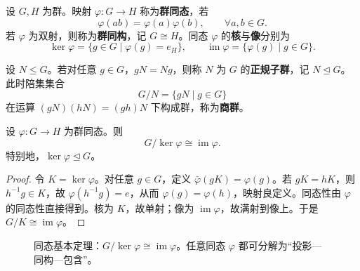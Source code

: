 \begin{definition}[群同态与同构]\label{def:homomorphism}
设 $G,H$ 为群。映射 $\varphi:G\to H$ 称为\textbf{群同态}，若
\[
\varphi(ab)=\varphi(a)\varphi(b),\qquad \forall a,b\in G.
\]
若 $\varphi$ 为双射，则称为\textbf{群同构}，记 $G\cong H$。同态 $\varphi$ 的\textbf{核}与\textbf{像}分别为
\[
\ker\varphi=\{g\in G\mid \varphi(g)=e_H\},\qquad
\operatorname{im}\varphi=\{\varphi(g)\mid g\in G\}.
\]
\end{definition}

\begin{definition}[正规子群与商群]\label{def:normal_subgroup}
设 $N\le G$。若对任意 $g\in G$，$gN=Ng$，则称 $N$ 为 $G$ 的\textbf{正规子群}，记 $N\trianglelefteq G$。此时陪集集合
\[
G/N=\{gN\mid g\in G\}
\]
在运算 $(gN)(hN)=(gh)N$ 下构成群，称为\textbf{商群}。
\end{definition}

\begin{theorem}[同态基本定理]\label{thm:first_isomorphism}
设 $\varphi:G\to H$ 为群同态。则
\[
G/\ker\varphi\cong \operatorname{im}\varphi.
\]
特别地，$\ker\varphi\trianglelefteq G$。
\end{theorem}

\begin{proof}
令 $K=\ker\varphi$。对任意 $g\in G$，定义 $\bar\varphi(gK)=\varphi(g)$。若 $gK=hK$，则 $h^{-1}g\in K$，故 $\varphi(h^{-1}g)=e$，从而 $\varphi(g)=\varphi(h)$，映射良定义。同态性由 $\varphi$ 的同态性直接得到。核为 $K$，故单射；像为 $\operatorname{im}\varphi$，故满射到像上。于是 $G/K\cong \operatorname{im}\varphi$。
\end{proof}

\begin{figure}[htbp]
\centering
{}
\caption{同态基本定理：$G/\ker\varphi\cong\operatorname{im}\varphi$。任意同态 $\varphi$ 都可分解为“投影—同构—包含”。}
\label{fig:first_isomorphism}
\end{figure}

